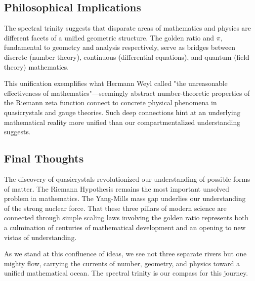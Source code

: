 \documentclass[12pt]{article}
\begin{document}
\subsection{Philosophical Implications}

The spectral trinity suggests that disparate areas of mathematics and physics are different facets of a unified geometric structure. The golden ratio and $\pi$, fundamental to geometry and analysis respectively, serve as bridges between discrete (number theory), continuous (differential equations), and quantum (field theory) mathematics.

This unification exemplifies what Hermann Weyl called "the unreasonable effectiveness of mathematics"—seemingly abstract number-theoretic properties of the Riemann zeta function connect to concrete physical phenomena in quasicrystals and gauge theories. Such deep connections hint at an underlying mathematical reality more unified than our compartmentalized understanding suggests.

\subsection{Final Thoughts}

The discovery of quasicrystals revolutionized our understanding of possible forms of matter. The Riemann Hypothesis remains the most important unsolved problem in mathematics. The Yang-Mills mass gap underlies our understanding of the strong nuclear force. That these three pillars of modern science are connected through simple scaling laws involving the golden ratio represents both a culmination of centuries of mathematical development and an opening to new vistas of understanding.

As we stand at this confluence of ideas, we see not three separate rivers but one mighty flow, carrying the currents of number, geometry, and physics toward a unified mathematical ocean. The spectral trinity is our compass for this journey.

\pagebreak
\end{document}
